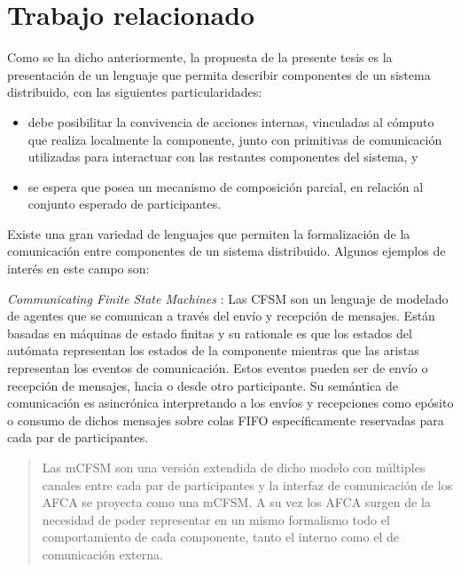 \section*{Trabajo relacionado}
\label{trabajo-relacionado}
Como se ha dicho anteriormente, la propuesta de la presente tesis es la presentación de un lenguaje que permita describir componentes de un sistema distribuido, con las siguientes particularidades: 
\begin{itemize}
\item debe posibilitar la convivencia de acciones internas, vinculadas al cómputo que realiza localmente la componente, junto con primitivas de comunicación utilizadas para interactuar con las restantes componentes del sistema, y
\item se espera que posea un mecanismo de composición parcial, en relación al conjunto esperado de participantes.
\end{itemize}

Existe una gran variedad de lenguajes que permiten la formalización de la comunicación entre componentes de un sistema distribuido. Algunos ejemplos de interés en este campo son:

\emph{Communicating Finite State Machines} \cite{brand:jacm-30_2}: Las CFSM son un lenguaje de modelado de agentes que se comunican a través del envío y recepción de mensajes. Están basadas en máquinas de estado finitas y su rationale es que los estados del autómata representan los estados de la componente mientras que las aristas representan los eventos de comunicación. Estos eventos pueden ser de envío o recepción de mensajes, hacia o desde otro participante. Su semántica de comunicación es asincrónica interpretando a los envíos y recepciones como epósito o consumo de dichos mensajes sobre colas FIFO específicamente reservadas para cada par de participantes.\\

\begin{quotation}
Las mCFSM son una versión extendida de dicho modelo con múltiples canales entre cada par de participantes y la interfaz de comunicación de los AFCA se proyecta como una mCFSM. A su vez los AFCA surgen de la necesidad de poder representar en un mismo formalismo todo el comportamiento de cada componente, tanto el interno como el de comunicación externa.
\end{quotation}

